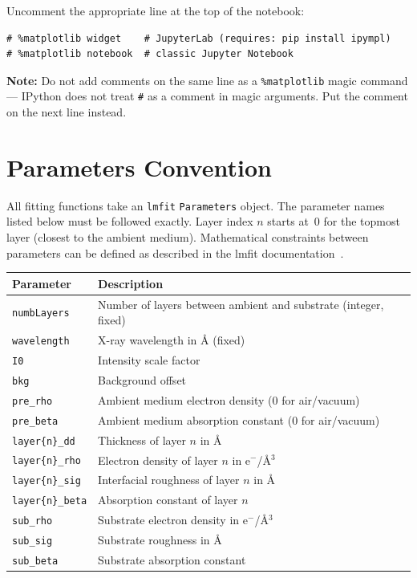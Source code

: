 \documentclass[11pt,a4paper]{article}
\begin{document}
Uncomment the appropriate line at the top of the notebook:
\begin{verbatim}
# %matplotlib widget    # JupyterLab (requires: pip install ipympl)
# %matplotlib notebook  # classic Jupyter Notebook
\end{verbatim}
\textbf{Note:} Do not add comments on the same line as a \texttt{\%matplotlib}
magic command --- IPython does not treat \texttt{\#} as a comment in magic arguments.
Put the comment on the next line instead.

\section{Parameters Convention}

All fitting functions take an \texttt{lmfit} \texttt{Parameters} object. The parameter
names listed below must be followed exactly. Layer index $n$ starts at~0 for the topmost
layer (closest to the ambient medium). Mathematical constraints between parameters can be
defined as described in the lmfit documentation~\cite{lmfit_constraints}.

\begin{center}
\renewcommand{\arraystretch}{1.3}
\begin{tabular}{lp{9.5cm}}
\hline\hline
\textbf{Parameter} & \textbf{Description} \\
\hline
\texttt{numbLayers}        & Number of layers between ambient and substrate (integer, fixed) \\
\texttt{wavelength}        & X-ray wavelength in \AA{} (fixed) \\
\texttt{I0}                & Intensity scale factor \\
\texttt{bkg}               & Background offset \\
\texttt{pre\_rho}          & Ambient medium electron density (0 for air/vacuum) \\
\texttt{pre\_beta}         & Ambient medium absorption constant (0 for air/vacuum) \\
\texttt{layer\{n\}\_dd}   & Thickness of layer $n$ in \AA{} \\
\texttt{layer\{n\}\_rho}  & Electron density of layer $n$ in e$^-$/\AA$^3$ \\
\texttt{layer\{n\}\_sig}  & Interfacial roughness of layer $n$ in \AA{} \\
\texttt{layer\{n\}\_beta} & Absorption constant of layer $n$ \\
\texttt{sub\_rho}          & Substrate electron density in e$^-$/\AA$^3$ \\
\texttt{sub\_sig}          & Substrate roughness in \AA{} \\
\texttt{sub\_beta}         & Substrate absorption constant \\
\hline\hline
\end{tabular}
\end{center}
\end{document}
